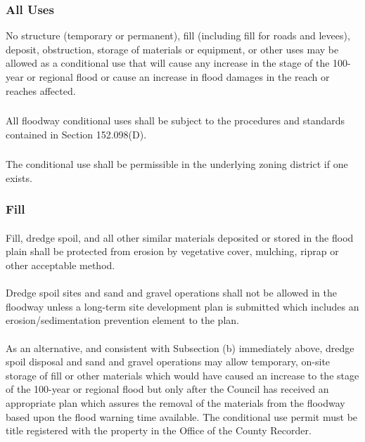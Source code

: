 \subsubsection{All Uses}
No structure (temporary or permanent), fill (including fill for roads and levees), deposit, obstruction, storage of materials or equipment, or other uses may be allowed as a conditional use that will cause any increase in the stage of the 100-year or regional flood or cause an increase in flood damages in the reach or reaches affected.
\subsubsection{}
All floodway conditional uses shall be subject to the procedures and standards contained in Section 152.098(D).
\subsubsection{}
The conditional use shall be permissible in the underlying zoning district if one exists.
\subsubsection{Fill}
\paragraph{}
Fill, dredge spoil, and all other similar materials deposited or stored in the flood plain shall be protected from erosion by vegetative cover, mulching, riprap or other acceptable method.
\paragraph{}
Dredge spoil sites and sand and gravel operations shall not be allowed in the floodway unless a long-term site development plan is submitted which includes an erosion/sedimentation prevention element to the plan.
\paragraph{}
As an alternative, and consistent with Subsection (b) immediately above, dredge spoil disposal and sand and gravel operations may allow temporary, on-site storage of fill or other materials which would have caused an increase to the stage of the 100-year or regional flood but only after the Council has received an appropriate plan which assures the removal of the materials from the floodway based upon the flood warning time available. The conditional use permit must be title registered with the property in the Office of the County Recorder.
